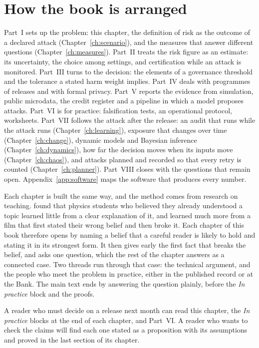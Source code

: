 \syntheticnote


\section{How the book is arranged}

Part~I sets up the problem: this chapter, the definition of risk as the outcome of a declared
attack (Chapter~\ref{ch:scenario}), and the measures that answer different questions
(Chapter~\ref{ch:measures}). Part~II treats the risk figure as an estimate: its uncertainty,
the choice among settings, and certification while an attack is monitored. Part~III turns to
the decision: the elements of a governance threshold and the tolerance a stated harm weight
implies. Part~IV deals with programmes of releases and with formal privacy. Part~V reports the
evidence from simulation, public microdata, the credit register and a pipeline in which a
model proposes attacks. Part~VI is for practice: falsification tests, an operational protocol,
worksheets. Part~VII follows the attack after the release: an audit that runs while the attack runs (Chapter~\ref{ch:learning}), exposure that changes over time (Chapter~\ref{ch:change}), dynamic models and Bayesian inference (Chapter~\ref{ch:dynamics}), how far the decision moves when its inputs move (Chapter~\ref{ch:chaos}), and attacks planned and recorded so that every retry is counted (Chapter~\ref{ch:planner}). Part~VIII closes with the questions that remain open. Appendix~\ref{app:software} maps the software
that produces every number.

Each chapter is built the same way, and the method comes from research on teaching. \citet{muller2008} found that physics students who believed they already understood a topic learned little from a clear explanation of it, and learned much more from a film that first stated their wrong belief and then broke it. Each chapter of this book therefore opens by naming a belief that a careful reader is likely to hold and stating it in its strongest form. It then gives early the first fact that breaks the belief, and asks one question, which the rest of the chapter answers as a connected case. Two threads run through that case: the technical argument, and the people who meet the problem in practice, either in the published record or at the Bank. The main text ends by answering the question plainly, before the \textit{In practice} block and the proofs.

A reader who must decide on a release next month can read this chapter, the \textit{In
practice} blocks at the end of each chapter, and Part~VI. A reader who wants to check the
claims will find each one stated as a proposition with its assumptions and proved in the last
section of its chapter.

